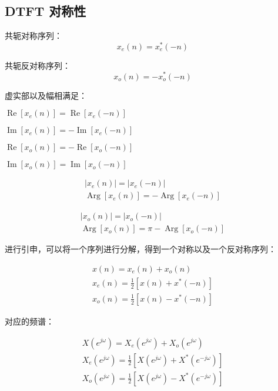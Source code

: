 \documentclass[cn,11pt,chinese,black,simple]{../elegantbook}
\begin{document}
\subsection{DTFT 对称性}

\begin{definition}[对称序列]
    共轭对称序列：\[x_e(n) = x_e^*(-n)\]

    共轭反对称序列：\[x_o(n) = -x_o^*(-n)\]
\end{definition}

虚实部以及幅相满足：

$\operatorname{Re}\left[x_{e}(n)\right]=\operatorname{Re}\left[x_{e}(-n)\right]$


$\operatorname{Im}\left[x_{e}(n)\right]=-\operatorname{Im}\left[x_{e}(-n)\right] $ 


$\operatorname{Re}\left[x_{o}(n)\right]=-\operatorname{Re}\left[x_{o}(-n)\right]$

$\operatorname{Im}\left[x_{o}(n)\right]=\operatorname{Im}\left[x_{o}(-n)\right]$

\begin{equation}\begin{array}{l}
    \left|x_{e}(n)\right|=\left|x_{e}(-n)\right| \\
    \operatorname{Arg}\left[x_{e}(n)\right]=-\operatorname{Arg}\left[x_{e}(-n)\right]
\end{array}\end{equation}

\begin{equation}\begin{array}{l}
\left|x_{o}(n)\right|=\left|x_{o}(-n)\right| \\
\operatorname{Arg}\left[x_{o}(n)\right]=\pi-\operatorname{Arg}\left[x_{o}(-n)\right]
\end{array}\end{equation}

进行引申，可以将一个序列进行分解，得到一个对称以及一个反对称序列：

\begin{equation}\begin{array}{l}
    x(n)=x_{e}(n)+x_{o}(n) \\
    x_{e}(n)=\frac{1}{2}\left[x(n)+x^{*}(-n)\right] \\
    x_{o}(n)=\frac{1}{2}\left[x(n)-x^{*}(-n)\right]
\end{array}\end{equation}

对应的频谱：

\begin{equation}\begin{array}{l}
    X\left(e^{j \omega}\right)=X_{e}\left(e^{j \omega}\right)+X_{o}\left(e^{j \omega}\right) \\
    X_{e}\left(e^{j \omega}\right)=\frac{1}{2}\left[X\left(e^{j \omega}\right)+X^{*}\left(e^{-j \omega}\right)\right] \\
    X_{o}\left(e^{j \omega}\right)=\frac{1}{2}\left[X\left(e^{j \omega}\right)-X^{*}\left(e^{-j \omega}\right)\right]
\end{array}\end{equation}
\end{document}
